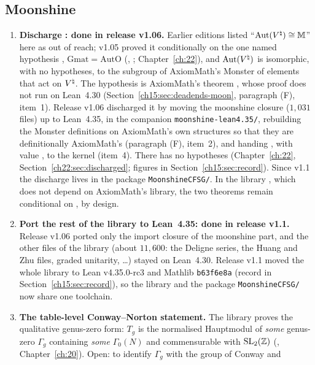 \subsection{Moonshine}
\begin{enumerate}
\item \textbf{Discharge : done in release v1.06.} Earlier editions listed
  ``$\operatorname{Aut}({V^{\natural}})\cong\mathbb M$'' here as out of reach; v1.05 proved it conditionally on the one named hypothesis
  , $\mathrm{Gmat}=\mathrm{AutO}$ (, ;
  Chapter~\ref{ch:22}), and $\operatorname{Aut}({V^{\natural}})$ is isomorphic, with no hypotheses, to the subgroup of AxiomMath's Monster of
  elements that act on ${V^{\natural}}$. The hypothesis is AxiomMath's theorem
  , whose proof does not run on Lean~4.30
  (Section~\ref{ch15:sec:deadends-moon}, paragraph (F), item~1). Release v1.06 discharged it by moving the moonshine
  closure ($1{,}031$ files) up to Lean~4.35, in the companion \texttt{moonshine-lean4.35/}, rebuilding the Monster
  definitions on AxiomMath's own structures so that they are definitionally AxiomMath's (paragraph (F), item~2), and
  handing , with value , to the kernel (item~4). There
   has no hypotheses (Chapter~\ref{ch:22}, Section~\ref{ch22:sec:discharged};
  figures in Section~\ref{ch15:sec:record}). Since v1.1 the discharge lives in the package \texttt{MoonshineCFSG/}. In
  the library , which does not depend on AxiomMath's library, the two theorems remain conditional on
  , by design.
\item \textbf{Port the rest of the library to Lean~4.35: done in release v1.1.} Release v1.06 ported only the import
  closure of the moonshine part, and the other files of the library (about $11{,}600$: the Deligne series, the Huang and
  Zhu files, graded unitarity, \dots) stayed on Lean~4.30. Release v1.1 moved the whole library to Lean v4.35.0-rc3 and
  Mathlib \texttt{b63f6e8a} (record in Section~\ref{ch15:sec:record}), so the library and the package
  \texttt{MoonshineCFSG/} now share one toolchain.
\item \textbf{The table-level Conway--Norton statement.} The library proves the qualitative genus-zero form: $T_g$ is the
  normalised Hauptmodul of \emph{some} genus-zero $\Gamma_g$ containing \emph{some} $\Gamma_0(N)$ and commensurable with
  $\mathrm{SL}_2({\mathbb{Z}})$ (, Chapter~\ref{ch:20}). Open: to identify $\Gamma_g$ with the group of Conway and

\end{enumerate}
